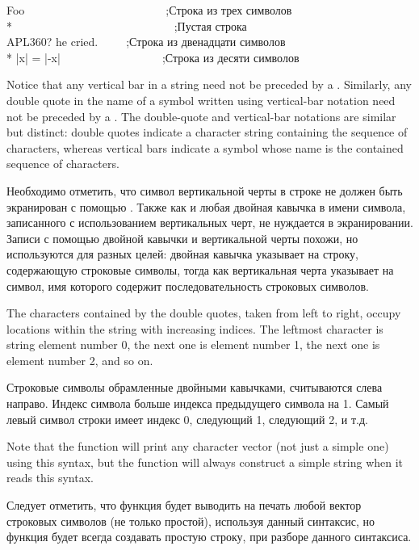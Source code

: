 \begin{lisp}
{\Xdquote}Foo{\Xdquote}~~~~~~~~~~~~~~~~~~~~~~~~~;{\rm Строка из трех символов} \\*
{\Xdquote}{\Xdquote}~~~~~~~~~~~~~~~~~~~~~~~~~~~~;{\rm Пустая строка} \\
{\Xdquote}{\Xbackslash}{\Xdquote}APL{\Xbackslash}{\Xbackslash}360?{\Xbackslash}{\Xdquote} he
cried.{\Xdquote}~~~~~;{\rm Строка из двенадцати символов} \\*
{\Xdquote}|x| = |-x|{\Xdquote}~~~~~~~~~~~~~~~~~~;{\rm Строка из десяти символов}
\end{lisp}
Notice that any vertical bar \cd{|} in a string need not be
preceded by a \cd{{\Xbackslash}}.  Similarly, any double quote in the name
of a symbol written using vertical-bar notation need not be
preceded by a \cd{{\Xbackslash}}.  The double-quote and vertical-bar notations
are similar but distinct: double quotes indicate a character string
containing the sequence of characters,
whereas vertical bars indicate a symbol whose name is the contained
sequence of characters.

Необходимо отметить, что символ вертикальной черты \cd{|} в строке не должен быть
экранирован с помощью \cd{{\Xbackslash}}. Также как и любая двойная кавычка в имени
символа, записанного с использованием вертикальных черт, не нуждается в
экранировании. Записи с помощью двойной кавычки и вертикальной черты похожи, но
используются для разных целей: двойная кавычка указывает на строку, содержающую
строковые символы, тогда как вертикальная черта указывает на символ, имя
которого содержит последовательность строковых символов.

The characters contained by the double quotes, taken from left to right,
occupy locations within the string with increasing indices.
The leftmost character is string element number 0, the next one
is element number 1, the next one is element number 2, and so on.

Строковые символы обрамленные двойными кавычками, считываются слева
направо. Индекс символа больше индекса предыдущего символа на 1. Самый левый
символ строки имеет индекс 0, следующий 1, следующий 2, и т.д.

Note that the function  will print any character vector
(not just a simple one)
using this syntax, but the function  will always construct
a simple string when it reads this syntax.

Следует отметить, что функция  будет выводить на печать любой вектор
строковых символов (не только простой), используя данный синтаксис, но функция
 будет всегда создавать простую строку, при разборе данного синтаксиса.

